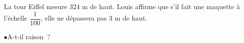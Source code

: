 \documentclass[exercice]{thedocument}%
\begin{document}
%
La tour Eiffel mesure 324 m de haut. Louis affirme que s'il fait une maquette
à l'échelle $\dfrac1{100}$, elle ne dépassera pas 3 m de haut.\par\medskip
$\bullet$\quad A-t-il raison~?
\end{document}
